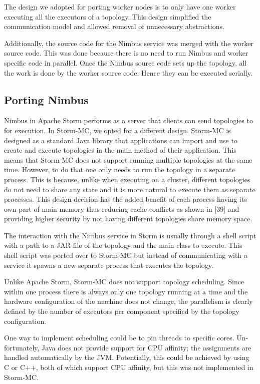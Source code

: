 \documentclass[bsc,logo,frontabs,twoside,singlespacing,normalheadings,parskip]{infthesis}\usepackage[]{graphicx}\usepackage[]{color}
\begin{document}
The design we adopted for porting worker nodes is to only have one worker executing all the executors of a topology. This design simplified the communication model and allowed removal of unnecessary abstractions.

Additionally, the source code for the Nimbus service was merged with the worker source code. This was done because there is no need to run Nimbus and worker specific code in parallel. Once the Nimbus source code sets up the topology, all the work is done by the worker source code. Hence they can be executed serially.

\subsection{Porting Nimbus}

Nimbus in Apache Storm performs as a server that clients can send topologies to for execution. In Storm-MC, we opted for a different design. Storm-MC is designed as a standard Java library that applications can import and use to create and execute topologies in the main method of their application. This means that Storm-MC does not support running multiple topologies at the same time. However, to do that one only needs to run the topology in a separate process. This is because, unlike when executing on a cluster, different topologies do not need to share any state and it is more natural to execute them as separate processes. This design decision has the added benefit of each process having its own part of main memory thus reducing cache conflicts as shown in [39] and providing higher security by not having different topologies share memory space.

The interaction with the Nimbus service in Storm is usually through a shell script with a path to a JAR file of the topology and the main class to execute. This shell script was ported over to Storm-MC but instead of communicating with a service it spawns a new separate process that executes the topology.

Unlike Apache Storm, Storm-MC does not support topology scheduling. Since within one process there is always only one topology running at a time and the hardware configuration of the machine does not change, the parallelism is clearly defined by the number of executors per component specified by the topology configuration.

One way to implement scheduling could be to pin threads to specific cores. Un- fortunately, Java does not provide support for CPU affinity; the assignments are handled automatically by the JVM. Potentially, this could be achieved by using C or C++, both of which support CPU affinity, but this was not implemented in Storm-MC.
\end{document}
